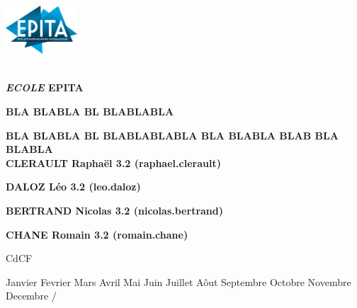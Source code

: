 
\begin{center}
\includegraphics[width=0.2\textwidth]{figuras/Epita.png}

\\

\textbf{\textit{ECOLE} EPITA}

\uppercase{\textbf{BLA BLABLA BL BLABLABLA}}

\vspace{6cm}

\uppercase{\textbf{BLA BLABLA BL BLABLABLABLA BLA BLABLA BLAB BLA BLABLA}}\\[5cm]


\textbf{CLERAULT Raphaël 3.2 (raphael.clerault)}

\textbf{DALOZ Léo 3.2 (leo.daloz)}

\textbf{BERTRAND Nicolas 3.2 (nicolas.bertrand)}

\textbf{CHANE Romain 3.2 (romain.chane)}

\end{center}

\vspace{0.2cm}
\hfill
\begin{minipage}{9cm}


\end{minipage}

\begin{center}
\vfill
\vspace{1cm}

CdCF \\

\newcommand{\mes}{\ifcase\month\or 
    Janvier \or Fevrier \or Mars \or Avril \or Mai \or Juin \or 
    Juillet \or Aôut \or Septembre \or Octobre \or Novembre \or 
    Decembre \fi} 
    
\def\ano{\expandafter\YEAR\the\year}
\def\YEAR#1#2#3#4{#1#2#3#4}
    
{ \mes / \ano}


\end{center}